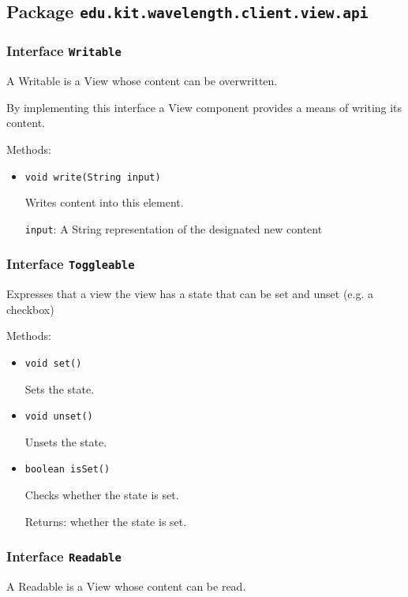 \subsection{Package \lstinline{edu.kit.wavelength.client.view.api}}
\label{pkg:edu.kit.wavelength.client.view.api}


\subsubsection{Interface \texttt{Writable}}
\label{type:edu.kit.wavelength.client.view.api.Writable}
A Writable is a View whose content can be overwritten.
 
 By implementing this interface a View component provides a means of writing
 its content.

Methods:
\begin{itemize}
\item \texttt{void write(String input)}

Writes content into this element.

\texttt{input}: A String representation of the designated new content

\end{itemize}

\subsubsection{Interface \texttt{Toggleable}}
\label{type:edu.kit.wavelength.client.view.api.Toggleable}
Expresses that a view the view has a state that can be set and unset (e.g. a checkbox)

Methods:
\begin{itemize}
\item \texttt{void set()}

Sets the state.

\item \texttt{void unset()}

Unsets the state.

\item \texttt{boolean isSet()}

Checks whether the state is set.

Returns: whether the state is set.

\end{itemize}

\subsubsection{Interface \texttt{Readable}}
\label{type:edu.kit.wavelength.client.view.api.Readable}
A Readable is a View whose content can be read.
 

